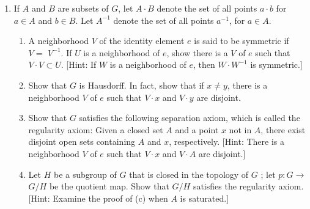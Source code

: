 \begin{enumerate}[itemsep=0.4em, parsep=0pt, topsep=0pt, partopsep=0pt, leftmargin=*, label=\arabic*., ref=\arabic*]
\item If \(A\) and \(B\) are subsets of \(G\), let \(A \cdot B\) denote the set of all points \(a \cdot b\) for \(a \in A\) and \(b \in B\). Let \(A^{-1}\) denote the set of all points \(a^{-1}\), for \(a \in A\).
  \begin{enumerate}[itemsep=0.2em, parsep=0pt, topsep=0pt, partopsep=0pt, leftmargin=*, label=(\alph*), align=left]
  \item A neighborhood \(V\) of the identity element \(e\) is said to be symmetric if \(V =\) \(V^{-1}\). If \(U\) is a neighborhood of \(e\), show there is a  \(V\) of \(e\) such that \(V \cdot V \subset U\). [Hint: If \(W\) is a neighborhood of \(e\), then \(W \cdot {W}^{-1}\) is symmetric.]
  \item Show that \(G\) is Hausdorff. In fact, show that if \(x \neq y\), there is a neighborhood \(V\) of \(e\) such that \(V \cdot x\) and \(V \cdot y\) are disjoint.
  \item Show that \(G\) satisfies the following separation axiom, which is called the regularity axiom: Given a closed set \(A\) and a point \(x\) not in \(A\), there exist disjoint open sets containing \(A\) and \(x\), respectively. [Hint: There is a neighborhood \(V\) of \(e\) such that \(V \cdot x\) and \(V \cdot A\) are disjoint.]
  \item Let \(H\) be a subgroup of \(G\) that is closed in the topology of \(G\) ; let \(p : G \rightarrow\) \(G/H\) be the quotient map. Show that \(G/H\) satisfies the regularity axiom. [Hint: Examine the proof of (c) when \(A\) is saturated.]
  \end{enumerate}
\end{enumerate}
